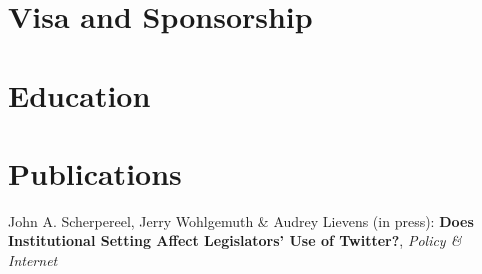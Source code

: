 \documentclass[10pt,a4paper,merriweather]{moderncv}        %
\begin{document}

\section{Visa and Sponsorship}


\section{Education}

\section{Publications}
\small John A. Scherpereel, Jerry Wohlgemuth \& Audrey Lievens (in press): \textbf{Does Institutional Setting Affect Legislators’ Use of Twitter?}, \textit{Policy \& Internet}

\clearpage





\end{document}
